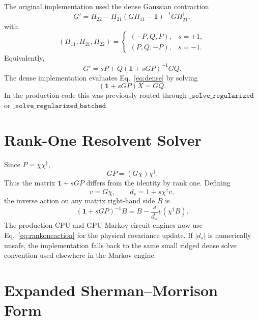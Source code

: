 \documentclass[aps,prb,onecolumn,nofootinbib,superscriptaddress]{revtex4-2}
\newcommand{\Id}{\mathbf{1}}
\begin{document}
The original implementation used the dense Gaussian contraction
\begin{equation}
    G' = H_{22} - H_{21}(G H_{11}-\Id)^{-1}G H_{21}^\dagger ,
\end{equation}
with
\begin{equation}
    (H_{11},H_{21},H_{22}) =
    \begin{cases}
        (-P,Q,P), & s=+1,\\
        (P,Q,-P), & s=-1.
    \end{cases}
\end{equation}
Equivalently,
\begin{equation}
    \boxed{
    G' = sP + Q(\Id+sGP)^{-1}GQ .
    }
    \label{eq:dense}
\end{equation}
The dense implementation evaluates Eq.~\eqref{eq:dense} by solving
\begin{equation}
    (\Id+sGP)X = GQ.
\end{equation}
In the production code this was previously routed through
\(\texttt{\_solve\_regularized}\) or \(\texttt{\_solve\_regularized\_batched}\).

\section{Rank-One Resolvent Solver}

Since \(P=\chi\chi^\dagger\),
\begin{equation}
    GP = (G\chi)\chi^\dagger .
\end{equation}
Thus the matrix \(\Id+sGP\) differs from the identity by rank one.  Defining
\begin{equation}
    v=G\chi,\qquad d_s = 1+s\chi^\dagger v,
\end{equation}
the inverse action on any matrix right-hand side \(B\) is
\begin{equation}
    \boxed{
    (\Id+sGP)^{-1}B
    =
    B-\frac{s}{d_s}v(\chi^\dagger B).
    }
    \label{eq:rankoneaction}
\end{equation}
The production CPU and GPU Markov-circuit engines now use
Eq.~\eqref{eq:rankoneaction} for the physical covariance update.  If
\(|d_s|\) is numerically unsafe, the implementation falls back to the same
small ridged dense solve convention used elsewhere in the Markov engine.

\section{Expanded Sherman--Morrison Form}
\end{document}
